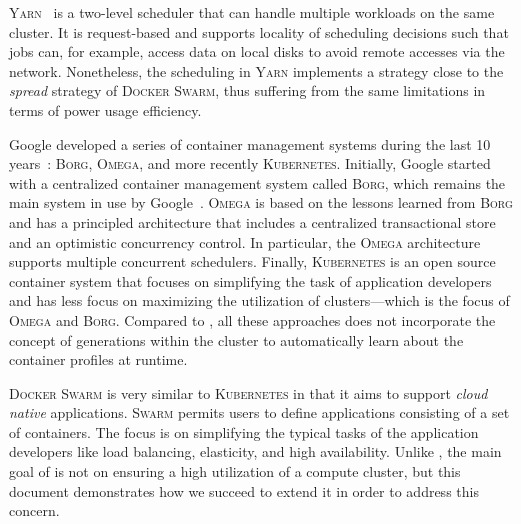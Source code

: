 \textsc{Yarn}~\cite{Yarn} is a two-level scheduler that can handle multiple workloads on the same cluster.
It is request-based and supports locality of scheduling decisions such that jobs can, for example, access data on local disks to avoid remote accesses via the network.
Nonetheless, the scheduling in \textsc{Yarn} implements a strategy close to the \emph{spread} strategy of \textsc{Docker Swarm}, thus suffering from the same limitations in terms of power usage efficiency.

Google developed a series of container management systems during the last 10 years~\cite{Burns:2016:BOK:2930840.2890784}: \textsc{Borg}, \textsc{Omega}, and more recently \textsc{Kubernetes}.
Initially, Google started with a centralized container management system called \textsc{Borg}, which remains the main system in use by Google~\cite{DBLP:conf/eurosys/VermaPKOTW15}.
\textsc{Omega} is based on the lessons learned from \textsc{Borg} and has a principled architecture that includes a centralized transactional store and an optimistic concurrency control.
In particular, the \textsc{Omega} architecture supports multiple concurrent schedulers.
Finally, \textsc{Kubernetes} is an open source container system that focuses on simplifying the task of application developers and has less focus on maximizing the utilization of clusters---which is the focus of \textsc{Omega} and \textsc{Borg}.
Compared to \GP{}, all these approaches does not incorporate the concept of generations within the cluster to automatically learn about the container profiles at runtime.

\textsc{Docker Swarm} is very similar to \textsc{Kubernetes} in that it aims to support \emph{cloud native} applications.
\textsc{Swarm} permits users to define applications consisting of a set of containers.
The focus is on simplifying the typical tasks of the application developers like load balancing, elasticity, and high availability.
Unlike \GP, the main goal of  is not on ensuring a high utilization of a compute cluster, but this document demonstrates how we succeed to extend it in order to address this concern.
